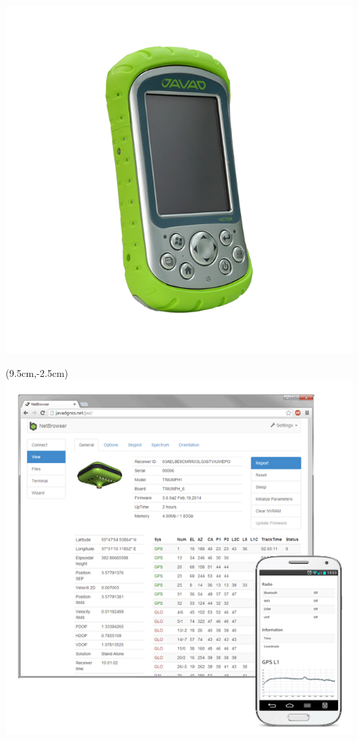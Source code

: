 \documentclass[xetex,с,aspectratio=169]{beamer}
\begin{document}
\begin{frame}
\begin{textblock*}{3cm}
    \includegraphics[width=\textwidth]{../img/javad-victor}
  \end{textblock*}
  \begin{textblock*}{3.25cm}(9.5cm,-2.5cm)
    \includegraphics[width=\textwidth]{../img/javad-netbrowser}

\end{textblock*}
\end{frame}
\end{document}
